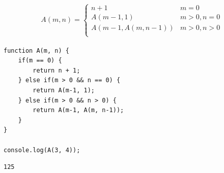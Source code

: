 \vspace{0.5cm}


\begin{align}\nonumber
	A(m, n) =
	\begin{cases}
		n + 1             & m = 0        \\
		A(m-1, 1)         & m > 0, n = 0 \\
		A(m-1, A(m, n-1)) & m > 0, n > 0 \\
	\end{cases}
\end{align}

\begin{lstlisting}[style=htmlcssjs]
function A(m, n) {
    if(m == 0) {
        return n + 1;
    } else if(m > 0 && n == 0) {
        return A(m-1, 1);
    } else if(m > 0 && n > 0) {
        return A(m-1, A(m, n-1));
    }
}

console.log(A(3, 4));
\end{lstlisting}

\begin{tcolorbox}
	\begin{verbatim}
125
	\end{verbatim}
\end{tcolorbox}

